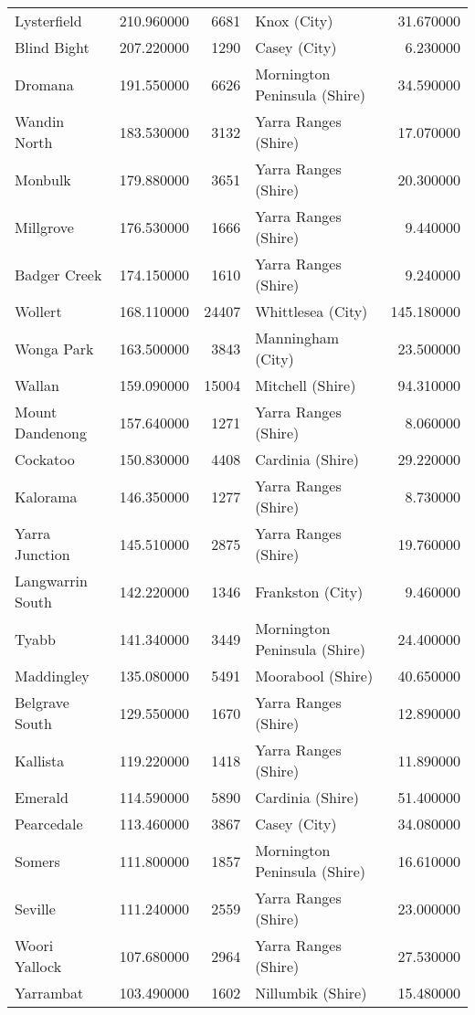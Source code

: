 \begin{table}
\begin{tabular}{lrrlr}
Lysterfield & 210.960000 & 6681 & Knox (City) & 31.670000 \\
Blind Bight & 207.220000 & 1290 & Casey (City) & 6.230000 \\
Dromana & 191.550000 & 6626 & Mornington Peninsula (Shire) & 34.590000 \\
Wandin North & 183.530000 & 3132 & Yarra Ranges (Shire) & 17.070000 \\
Monbulk & 179.880000 & 3651 & Yarra Ranges (Shire) & 20.300000 \\
Millgrove & 176.530000 & 1666 & Yarra Ranges (Shire) & 9.440000 \\
Badger Creek & 174.150000 & 1610 & Yarra Ranges (Shire) & 9.240000 \\
Wollert & 168.110000 & 24407 & Whittlesea (City) & 145.180000 \\
Wonga Park & 163.500000 & 3843 & Manningham (City) & 23.500000 \\
Wallan & 159.090000 & 15004 & Mitchell (Shire) & 94.310000 \\
Mount Dandenong & 157.640000 & 1271 & Yarra Ranges (Shire) & 8.060000 \\
Cockatoo & 150.830000 & 4408 & Cardinia (Shire) & 29.220000 \\
Kalorama & 146.350000 & 1277 & Yarra Ranges (Shire) & 8.730000 \\
Yarra Junction & 145.510000 & 2875 & Yarra Ranges (Shire) & 19.760000 \\
Langwarrin South & 142.220000 & 1346 & Frankston (City) & 9.460000 \\
Tyabb & 141.340000 & 3449 & Mornington Peninsula (Shire) & 24.400000 \\
Maddingley & 135.080000 & 5491 & Moorabool (Shire) & 40.650000 \\
Belgrave South & 129.550000 & 1670 & Yarra Ranges (Shire) & 12.890000 \\
Kallista & 119.220000 & 1418 & Yarra Ranges (Shire) & 11.890000 \\
Emerald & 114.590000 & 5890 & Cardinia (Shire) & 51.400000 \\
Pearcedale & 113.460000 & 3867 & Casey (City) & 34.080000 \\
Somers & 111.800000 & 1857 & Mornington Peninsula (Shire) & 16.610000 \\
Seville & 111.240000 & 2559 & Yarra Ranges (Shire) & 23.000000 \\
Woori Yallock & 107.680000 & 2964 & Yarra Ranges (Shire) & 27.530000 \\
Yarrambat & 103.490000 & 1602 & Nillumbik (Shire) & 15.480000 \\

\end{tabular}
\end{table}
